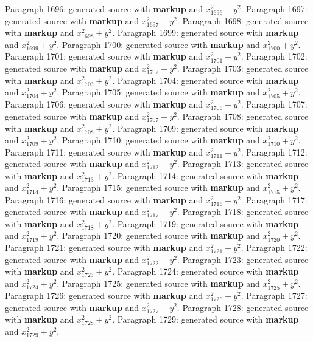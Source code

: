 \documentclass{article}
\begin{document}
Paragraph 1696: generated source with \textbf{markup} and $x_{1696}^2 + y^2$.
Paragraph 1697: generated source with \textbf{markup} and $x_{1697}^2 + y^2$.
Paragraph 1698: generated source with \textbf{markup} and $x_{1698}^2 + y^2$.
Paragraph 1699: generated source with \textbf{markup} and $x_{1699}^2 + y^2$.
Paragraph 1700: generated source with \textbf{markup} and $x_{1700}^2 + y^2$.
Paragraph 1701: generated source with \textbf{markup} and $x_{1701}^2 + y^2$.
Paragraph 1702: generated source with \textbf{markup} and $x_{1702}^2 + y^2$.
Paragraph 1703: generated source with \textbf{markup} and $x_{1703}^2 + y^2$.
Paragraph 1704: generated source with \textbf{markup} and $x_{1704}^2 + y^2$.
Paragraph 1705: generated source with \textbf{markup} and $x_{1705}^2 + y^2$.
Paragraph 1706: generated source with \textbf{markup} and $x_{1706}^2 + y^2$.
Paragraph 1707: generated source with \textbf{markup} and $x_{1707}^2 + y^2$.
Paragraph 1708: generated source with \textbf{markup} and $x_{1708}^2 + y^2$.
Paragraph 1709: generated source with \textbf{markup} and $x_{1709}^2 + y^2$.
Paragraph 1710: generated source with \textbf{markup} and $x_{1710}^2 + y^2$.
Paragraph 1711: generated source with \textbf{markup} and $x_{1711}^2 + y^2$.
Paragraph 1712: generated source with \textbf{markup} and $x_{1712}^2 + y^2$.
Paragraph 1713: generated source with \textbf{markup} and $x_{1713}^2 + y^2$.
Paragraph 1714: generated source with \textbf{markup} and $x_{1714}^2 + y^2$.
Paragraph 1715: generated source with \textbf{markup} and $x_{1715}^2 + y^2$.
Paragraph 1716: generated source with \textbf{markup} and $x_{1716}^2 + y^2$.
Paragraph 1717: generated source with \textbf{markup} and $x_{1717}^2 + y^2$.
Paragraph 1718: generated source with \textbf{markup} and $x_{1718}^2 + y^2$.
Paragraph 1719: generated source with \textbf{markup} and $x_{1719}^2 + y^2$.
Paragraph 1720: generated source with \textbf{markup} and $x_{1720}^2 + y^2$.
Paragraph 1721: generated source with \textbf{markup} and $x_{1721}^2 + y^2$.
Paragraph 1722: generated source with \textbf{markup} and $x_{1722}^2 + y^2$.
Paragraph 1723: generated source with \textbf{markup} and $x_{1723}^2 + y^2$.
Paragraph 1724: generated source with \textbf{markup} and $x_{1724}^2 + y^2$.
Paragraph 1725: generated source with \textbf{markup} and $x_{1725}^2 + y^2$.
Paragraph 1726: generated source with \textbf{markup} and $x_{1726}^2 + y^2$.
Paragraph 1727: generated source with \textbf{markup} and $x_{1727}^2 + y^2$.
Paragraph 1728: generated source with \textbf{markup} and $x_{1728}^2 + y^2$.
Paragraph 1729: generated source with \textbf{markup} and $x_{1729}^2 + y^2$.
\end{document}
